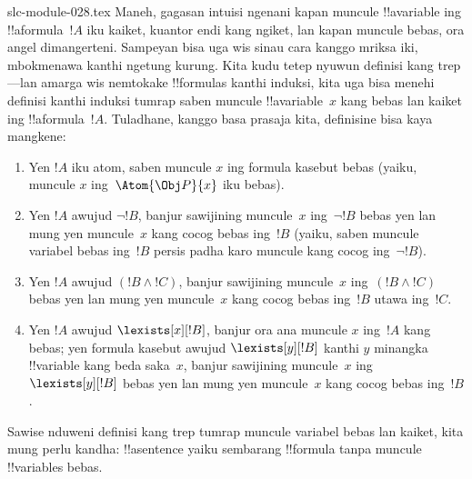 \begin{filecontents*}[overwrite]{slc-module-028.tex}
Maneh, gagasan intuisi ngenani kapan muncule !!a{variable} ing
!!a{formula}~$!A$ iku kaiket, kuantor endi kang ngiket, lan kapan
muncule bebas, ora angel dimangerteni. Sampeyan bisa uga wis sinau cara
kanggo mriksa iki, mbokmenawa kanthi ngetung kurung. Kita kudu tetep
nyuwun definisi kang trep---lan amarga wis nemtokake !!{formula}s kanthi
induksi, kita uga bisa menehi definisi kanthi induksi tumrap saben
muncule !!a{variable}~$x$ kang bebas lan kaiket ing
!!a{formula}~$!A$. Tuladhane, kanggo basa prasaja kita, definisine bisa
kaya mangkene:
\begin{enumerate}
  \item Yen $!A$ iku atom, saben muncule $x$ ing formula kasebut bebas
  (yaiku, muncule $x$ ing~$\Atom{\Obj P}{x}$ iku bebas).
  \item Yen $!A$ awujud $\lnot !B$, banjur sawijining muncule~$x$
  ing~$\lnot !B$ bebas yen lan mung yen muncule~$x$ kang cocog bebas
  ing~$!B$ (yaiku, saben muncule variabel bebas ing~$
  !B$ persis padha karo muncule kang cocog ing~$\lnot !B$).
  \item Yen $!A$ awujud $(!B \land !C)$, banjur sawijining muncule~$x$
  ing~$(!B \land !C)$ bebas yen lan mung yen muncule~$x$ kang cocog
  bebas ing~$!B$ utawa ing~$!C$.
  \item Yen $!A$ awujud $\lexists[x][!B]$, banjur ora ana muncule
  $x$ ing~$!A$ kang bebas; yen formula kasebut awujud $\lexists[y][!B]$ kanthi
  $y$ minangka !!{variable} kang beda saka~$x$, banjur sawijining
  muncule~$x$ ing $\lexists[y][!B]$ bebas yen lan mung yen muncule~$x$
  kang cocog bebas ing~$!B$.
\end{enumerate}

Sawise nduweni definisi kang trep tumrap muncule variabel bebas lan
kaiket, kita mung perlu kandha: !!a{sentence} yaiku sembarang
!!{formula} tanpa muncule !!{variable}s bebas.


\end{filecontents*}

